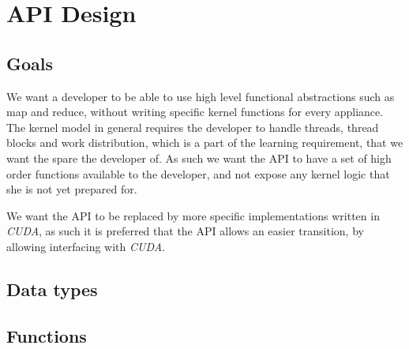 \section{API Design}
\subsection{Goals}
We want a developer to be able to use high level functional abstractions such as map and reduce, without writing specific kernel functions for every appliance. The kernel model in general requires the developer to handle threads, thread blocks and work distribution, which is a part of the learning requirement, that we want the spare the developer of.
As such we want the API to have a set of high order functions available to the developer, and not expose any kernel logic that she is not yet prepared for.

We want the API to be replaced by more specific implementations written in \textit{CUDA}, as such it is preferred that the API allows an easier transition, by allowing interfacing with \textit{CUDA}.

\subsection{Data types}


\subsection{Functions}
